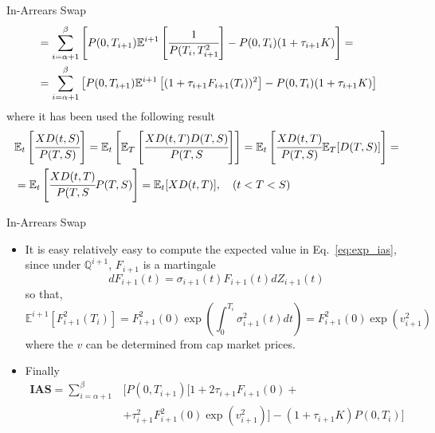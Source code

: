 \documentclass{beamer}
\begin{document}
\begin{frame}{In-Arrears Swap}
\begin{equation}
\begin{aligned}
&=\sum_{i=\alpha+1}^{\beta}\left[P(0,T_{i+1})\mathbb{E}^{i+1}\left[\cfrac{1}{P(T_i,T_{i+1}^2}\right]-P(0,T_i)(1+\tau_{i+1}K)\right] = \\
&=\sum_{i=\alpha+1}^{\beta}\left[P(0,T_{i+1})\mathbb{E}^{i+1}\left[(1+\tau_{i+1}F_{i+1}(T_i))^2\right]-P(0,T_i)(1+\tau_{i+1}K)\right]
\end{aligned}
\label{eq:exp_ias}
\end{equation}
where it has been used the following result
\begin{equation}
\begin{aligned}
&\mathbb{E}_t\left[\cfrac{XD(t,S)}{P(T,S)} \right]=\mathbb{E}_t\left[\mathbb{E}_T\left[\cfrac{XD(t,T)D(T,S)}{P(T,S} \right]\right]=\mathbb{E}_t\left[\cfrac{XD(t,T)}{P(T,S)}\mathbb{E}_T[D(T,S)]\right]= \\ 
& =\mathbb{E}_t\left[\cfrac{XD(t,T)}{P(T,S}P(T,S)\right]=\mathbb{E}_t[XD(t,T)],\quad (t<T<S)
\end{aligned}
\end{equation}
\end{frame}

\begin{frame}{In-Arrears Swap}
\begin{itemize}
\item It is easy relatively easy to compute the expected value in Eq.~\ref{eq:exp_ias}, since under $\mathbb{Q}^{i+1}$, $F_{i+1}$ is a martingale
\begin{equation*}
dF_{i+1}(t) = \sigma_{i+1}(t)F_{i+1}(t)dZ_{i+1}(t)
\end{equation*}
so that, 
\begin{equation}
\mathbb{E}^{i+1}[F_{i+1}^2(T_i)]=F_{i+1}^2(0)\exp\left(\int_0^{T_i}\sigma_{i+1}^2(t)dt\right) = F_{i+1}^2(0)\exp(v_{i+1}^2)
\end{equation}
where the $v$ can be determined from cap market prices.
\item Finally
\begin{equation}
\begin{aligned}
\textbf{IAS} = \sum_{i=\alpha+1}^{\beta}&[
P(0,T_{i+1}) [1+2\tau_{i+1}F_{i+1}(0) + \\ &+\tau_{i+1}^2 F_{i+1}^2(0)\exp(v_{i+1}^2)]-(1+\tau_{i+1}K)P(0,T_i)] \\
\end{aligned}
\label{eq:ias_price}
\end{equation}
\end{itemize}
\end{frame}
\end{document}

